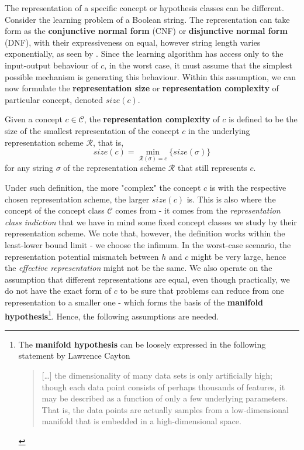\documentclass[10pt]{article}
\begin{document}
The representation of a specific concept or hypothesis classes can be different. Consider the learning problem of a Boolean string. The representation can take form as the \textbf{conjunctive normal form} (CNF) or \textbf{disjunctive normal form} (DNF), with their expressiveness on equal, however string length varies exponentially, as seen by \cite{Wegener1987,MiltersenRadhakrishnanWegener2005,DarwicheMarquis2002}. Since the learning algorithm has access only to the input-output behaviour of $c$, in the worst case, it must assume that the simplest possible mechanism is generating this behaviour. Within this assumption, we can now formulate the \textbf{representation size} or \textbf{representation complexity} of particular concept, denoted $size(c)$. 
\begin{definition}
    Given a concept $c\in\mathcal{C}$, the \textbf{representation complexity} of $c$ is defined to be the size of the smallest representation of the concept $c$ in the underlying representation scheme $\mathcal{R}$, that is, 
    \begin{equation*}
    size(c) = \min_{\mathcal{R}(\sigma)=c}\{size(\sigma)\}
\end{equation*}
for any string $\sigma$ of the representation scheme $\mathcal{R}$ that still represents $c$.
\end{definition}
Under such definition, the more "complex" the concept $c$ is with the respective chosen representation scheme, the larger $size(c)$ is. This is also where the concept of the concept class $\mathcal{C}$ comes from - it comes from the \textit{representation class indiction} that we have in mind some fixed concept classes we study by their representation scheme. We note that, however, the definition works within the least-lower bound limit - we choose the infimum. In the worst-case scenario, the representation potential mismatch between $h$ and $c$ might be very large, hence the \textit{effective representation} might not be the same. We also operate on the assumption that different representations are equal, even though practically, we do not have the exact form of $c$ to be sure that problems can reduce from one representation to a smaller one - which forms the basis of the \textbf{manifold hypothesis}\footnote{The \textbf{manifold hypothesis} can be loosely expressed in the following statement by Lawrence Cayton \begin{quote}
  [\dots] the dimensionality of many data sets is only artificially high; though each data point consists of perhaps thousands of features, it may be described as a function of only a few underlying parameters. That is, the data points are actually samples from a low-dimensional manifold that is embedded in a high-dimensional space. 
\end{quote}}. Hence, the following assumptions are needed. 
\end{document}
